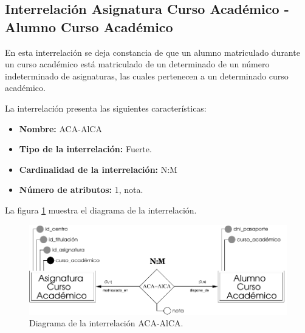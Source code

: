 \subsection{Interrelación Asignatura Curso Académico - Alumno Curso Académico}

   \begin{description}
      \item[Definición] En esta interrelación se deja constancia de que un
      alumno matriculado durante un curso académico está matriculado de un
      determinado de un número indeterminado de asignaturas, las cuales
      pertenecen a un determinado curso académico.

      \item[Características] La interrelación presenta las siguientes
                             características:

         \begin{itemize}
            \item \textbf{Nombre:} ACA-AlCA
            \item \textbf{Tipo de la interrelación:} Fuerte.
            \item \textbf{Cardinalidad de la interrelación:} N:M
            \item \textbf{Número de atributos:} 1, nota.
         \end{itemize}

      \item[Diagrama] La figura \ref{diagramaACA-AlCA} muestra el diagrama de la
                      interrelación.

       \item \begin{figure}[!ht]
            \begin{center}
            \includegraphics[]{07.Modelo_Entidad-Interrelacion/7.3.Analisis_Interrelaciones/diagramas/ACA-AlCA.pdf}
            \caption{Diagrama de la interrelación ACA-AlCA.}
            \label{diagramaACA-AlCA}
            \end{center}
         \end{figure}


\end{description}
